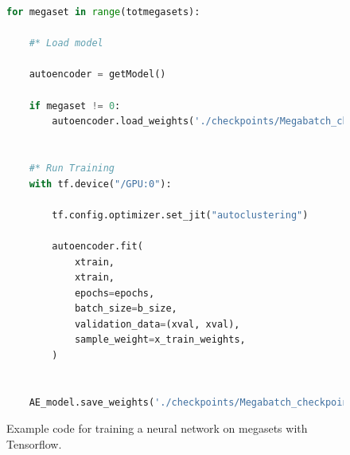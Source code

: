 \begin{figure}[h!]
    \centering
\begin{lstlisting}[language=Python, style=pythonstyle, label={code:megabatch_training}]
for megaset in range(totmegasets):
    
    #* Load model 

    autoencoder = getModel()
    
    if megaset != 0:
        autoencoder.load_weights('./checkpoints/Megabatch_checkpoint')
        
        
    #* Run Training
    with tf.device("/GPU:0"):

        tf.config.optimizer.set_jit("autoclustering")

        autoencoder.fit(
            xtrain,
            xtrain,
            epochs=epochs,
            batch_size=b_size,
            validation_data=(xval, xval),
            sample_weight=x_train_weights,
        )
        
    
    AE_model.save_weights('./checkpoints/Megabatch_checkpoint')

\end{lstlisting}
\caption[Tensorflow neural network training]{Example code for training a neural network on megasets with Tensorflow.}
\label{code:training}
\end{figure}

